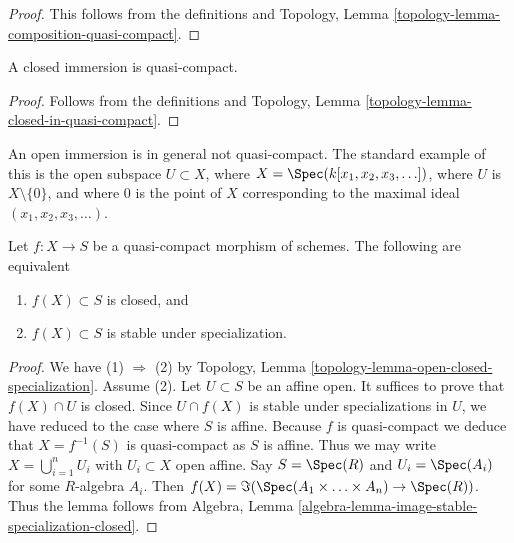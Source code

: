 \begin{proof}
This follows from the definitions and
Topology, Lemma \ref{topology-lemma-composition-quasi-compact}.
\end{proof}

\begin{lemma}
\label{lemma-closed-immersion-quasi-compact}
A closed immersion is quasi-compact.
\end{lemma}

\begin{proof}
Follows from the definitions and
Topology, Lemma \ref{topology-lemma-closed-in-quasi-compact}.
\end{proof}

\begin{example}
\label{example-open-immersion-not-quasi-compact}
An open immersion is in general not quasi-compact.
The standard example of this is the open subspace
$U \subset X$, where $X = \Spec(k[x_1, x_2, x_3, \ldots])$,
where $U$ is $X \setminus \{0\}$, and where $0$ is the point
of $X$ corresponding to the maximal ideal
$(x_1, x_2, x_3, \ldots)$.
\end{example}

\begin{lemma}
\label{lemma-image-quasi-compact-closed}
Let $f : X \to S$ be a quasi-compact morphism of schemes.
The following are equivalent
\begin{enumerate}
\item $f(X) \subset S$ is closed, and
\item $f(X) \subset S$ is stable under specialization.
\end{enumerate}
\end{lemma}

\begin{proof}
We have (1) $\Rightarrow$ (2) by
Topology, Lemma \ref{topology-lemma-open-closed-specialization}.
Assume (2). Let $U \subset S$ be an affine open. It suffices to prove
that $f(X) \cap U$ is closed. Since $U \cap f(X)$ is stable under
specializations in $U$, we have reduced to the case where $S$ is affine.
Because $f$ is quasi-compact we deduce that $X = f^{-1}(S)$ is
quasi-compact as $S$ is affine. Thus we may write
$X = \bigcup_{i = 1}^n U_i$ with $U_i \subset X$ open affine.
Say $S = \Spec(R)$ and
$U_i = \Spec(A_i)$ for some $R$-algebra $A_i$.
Then $f(X) = \Im(\Spec(A_1 \times \ldots \times A_n)
\to \Spec(R))$. Thus the lemma follows from
Algebra, Lemma \ref{algebra-lemma-image-stable-specialization-closed}.
\end{proof}

